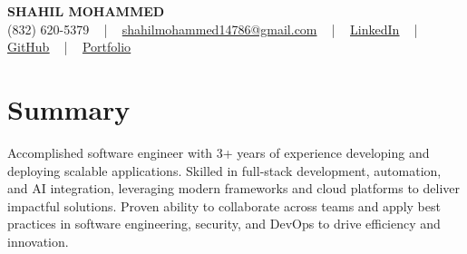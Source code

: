 \documentclass[letterpaper,10pt]{article}
\begin{document}
\begin{center}
    {\fontsize{14pt}{12pt}\selectfont \textbf{\MakeUppercase{Shahil Mohammed}}}\\ \vspace{2pt}
    \fontsize{10pt}{12pt}\selectfont (832) 620-5379 ~ | ~ \href{mailto:shahilmohammed14786@gmail.com}{shahilmohammed14786@gmail.com} ~ | ~  
    \href{https://www.linkedin.com/in/shahil-mohammed-9652931a1/}{\color{blue}\underline{LinkedIn}}  ~ | ~ 
    \href{https://github.com/freakbeast14}{\color{blue}\underline{GitHub}} ~ | ~ 
    \href{https://shahil-mohammed.netlify.app/}{\color{blue}\underline{Portfolio}}
    \vspace{-8pt}
\end{center}

\section{Summary}
\vspace{-2pt}\fontsize{8pt}{9pt}\selectfont
Accomplished software engineer with 3+ years of experience developing and deploying scalable applications. Skilled in full-stack development, automation, and AI integration, leveraging modern frameworks and cloud platforms to deliver impactful solutions. Proven ability to collaborate across teams and apply best practices in software engineering, security, and DevOps to drive efficiency and innovation.
 \vspace{-5pt}
 
\vspace{-2pt}
\end{document}

